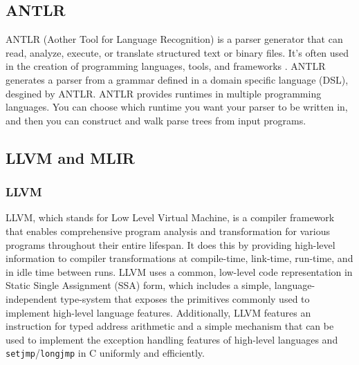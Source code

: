 \subsection{ANTLR}
ANTLR (Aother Tool for Language Recognition) is a parser generator that can
read, analyze, execute, or translate structured text or binary files. It's often
used in the creation of programming languages, tools, and frameworks
\cite{ANTLR}. ANTLR generates a parser from a grammar defined in a domain
specific language (DSL), desgined by ANTLR. ANTLR provides runtimes in multiple
programming languages. You can choose which runtime you want your parser to be
written in, and then you can construct and walk parse trees from input programs.
\subsection{LLVM and MLIR}
\subsubsection{LLVM}
LLVM, which stands for Low Level Virtual Machine, is a compiler framework that
enables comprehensive program analysis and transformation for various programs
throughout their entire lifespan. It does this by providing high-level
information to compiler transformations at compile-time, link-time, run-time,
and in idle time between runs. LLVM uses a common, low-level code representation
in Static Single Assignment (SSA) form, which includes a simple,
language-independent type-system that exposes the primitives commonly used to
implement high-level language features. Additionally, LLVM features an
instruction for typed address arithmetic and a simple mechanism that can be used
to implement the exception handling features of high-level languages and
\texttt{setjmp}/\texttt{longjmp} in C uniformly and efficiently.
